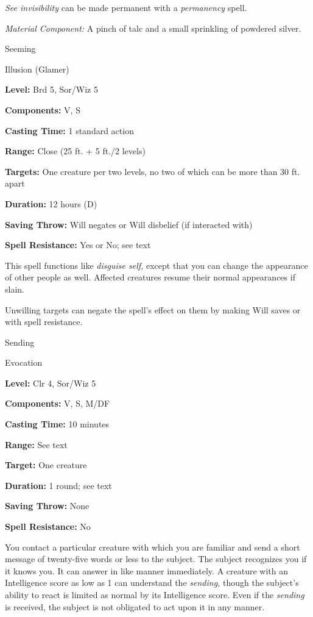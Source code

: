 \documentclass{article}
\begin{document}
\textit{See invisibility }can be made permanent with a \textit{permanency }spell.

\textit{Material Component: }A pinch of talc and a small sprinkling of powdered 
silver.

\vspace{12pt}
Seeming

Illusion (Glamer)

\textbf{Level:} Brd 5, Sor/Wiz 5

\textbf{Components:} V, S

\textbf{Casting Time:} 1 standard action

\textbf{Range:} Close (25 ft. + 5 ft./2 levels)

\textbf{Targets:} One creature per two levels, no two of which can be more than 
30 ft. apart

\textbf{Duration:} 12 hours (D)

\textbf{Saving Throw: }Will negates or Will disbelief (if interacted with)

\textbf{Spell Resistance:} Yes or No; see text

This spell functions like \textit{disguise self, }except that you can change the 
appearance of other people as well. Affected creatures resume their normal appearances 
if slain.

Unwilling targets can negate the spell's effect on them by making Will saves or 
with spell resistance.

\vspace{12pt}
Sending

Evocation

\textbf{Level:} Clr 4, Sor/Wiz 5

\textbf{Components:} V, S, M/DF

\textbf{Casting Time:} 10 minutes

\textbf{Range:} See text

\textbf{Target:} One creature

\textbf{Duration:} 1 round; see text

\textbf{Saving Throw:} None

\textbf{Spell Resistance:} No

You contact a particular creature with which you are familiar and send a short 
message of twenty-five words or less to the subject. The subject recognizes you 
if it knows you. It can answer in like manner immediately. A creature with an Intelligence 
score as low as 1 can understand the \textit{sending, }though the subject's ability 
to react is limited as normal by its Intelligence score. Even if the \textit{sending 
}is received, the subject is not obligated to act upon it in any manner.
\end{document}
